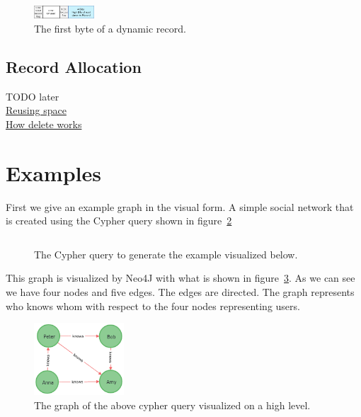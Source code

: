 \documentclass[a4paper,10pt]{article}
\begin{document}
            \begin{figure}[htp]\label{dynamic_first}
                \begin{center}
                    \includegraphics[keepaspectratio,height=0.2\textheight,width=0.2\textwidth]{img/03_record/dynamic_first_byte.png}
                \end{center}
                \caption{The first byte of a dynamic record.}
            \end{figure}

                            
        \subsection{Record Allocation}
            TODO later \\
            \href{https://neo4j.com/docs/operations-manual/current/performance/space-reuse/\#space-reuse}{Reusing space} \\
            \href{https://neo4j.com/developer/kb/how-deletes-workin-neo4j/}{How delete works} \\
        
\section{Examples}
    First we give an example graph in the visual form. A simple social network that is created using the Cypher query shown in figure~\ref{ex_q}
    \begin{figure}[htp]\label{ex_q}
        \begin{center}
            \inputminted{Cypher}{code/example_query.cy}
        \end{center}
        \caption{The Cypher query to generate the example visualized below.}
    \end{figure}
    This graph is visualized by Neo4J with what is shown in figure~\ref{graph}. As we can see we have four nodes and five edges. The edges are directed. The graph represents who knows whom with respect to the four nodes representing users.
    \begin{figure}[htp]\label{graph}
        \begin{center}
            \includegraphics[keepaspectratio,height=0.3\textheight,width=0.3\textwidth]{img/04_example/graph.png}
        \end{center}
        \caption{The graph of the above cypher query visualized on a high level.} 
    \end{figure}
    
\end{document}
